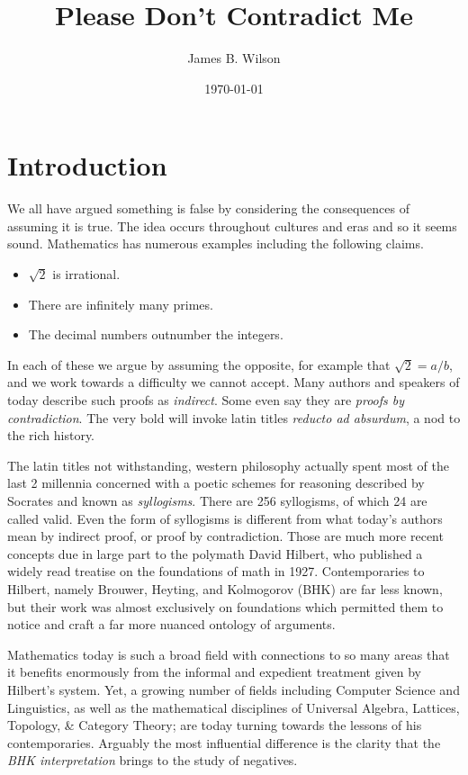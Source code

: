 \documentclass{amsart}
\title{Please Don't Contradict Me}
\author{James B. Wilson}
\date{\today}
\begin{document}
    \maketitle

\section{Introduction}
We all have argued something is false by considering the consequences 
of assuming it is true.   The idea occurs throughout cultures and 
eras and so it seems sound.  Mathematics has numerous examples including 
the following claims.
\begin{itemize}
    \item $\sqrt{2}$ is irrational.
    \item There are infinitely many primes.
    \item The decimal numbers outnumber the integers.
\end{itemize}
In each of these we argue by assuming the opposite, for example 
that $\sqrt{2}=a/b$, and we work towards a difficulty we cannot accept.
Many authors and speakers of today describe such proofs as 
\emph{indirect}.  Some even say they are \emph{proofs by contradiction}.
The very bold will invoke latin titles
\emph{reducto ad absurdum}, a nod to the rich history.

The latin titles not withstanding, western philosophy actually spent most of the
last 2 millennia concerned with a poetic schemes for reasoning described by
Socrates and known as \emph{syllogisms}.  There are 256 syllogisms, of which 24
are called valid.  Even the form of syllogisms is different from what 
today's authors mean by indirect proof, or proof by contradiction.  Those are
much more recent concepts due in large part to the polymath David Hilbert, who
published a widely read treatise on the foundations of math in 1927.
Contemporaries to Hilbert, namely Brouwer, Heyting, and Kolmogorov (BHK) are far
less known, but their work was almost exclusively on foundations 
which permitted them to notice and craft a far more nuanced ontology of arguments.

Mathematics today is such a broad field with connections to so many areas that
it benefits enormously from the informal and expedient treatment given by
Hilbert's system.  Yet, a growing number of fields including Computer Science
and Linguistics, as well as the mathematical disciplines of Universal Algebra,
Lattices,  Topology, \& Category Theory; are today turning towards the lessons
of his contemporaries.  Arguably the most influential difference is the clarity
that the \emph{BHK interpretation} brings to the study of negatives.
\end{document}
